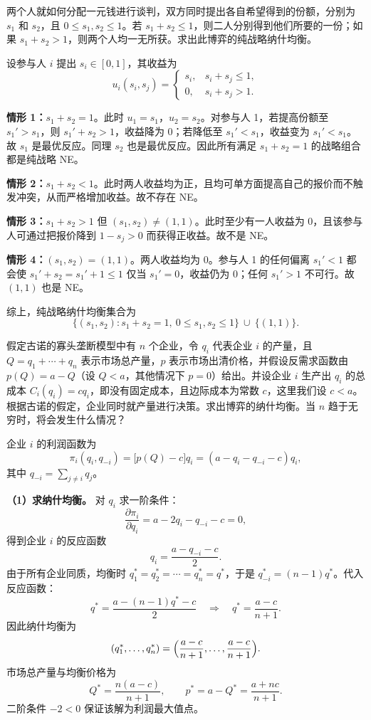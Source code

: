 两个人就如何分配一元钱进行谈判，双方同时提出各自希望得到的份额，分别为 $s_1$ 和 $s_2$，且 $0\le s_1,s_2\le1$。若 $s_1+s_2\le1$，则二人分别得到他们所要的一份；如果 $s_1+s_2>1$，则两个人均一无所获。求出此博弈的纯战略纳什均衡。

\sol
设参与人 $i$ 提出 $s_i\in[0,1]$，其收益为
\[
  u_i(s_i,s_j)=\begin{cases}
    s_i, & s_i+s_j\le1,\\
    0, & s_i+s_j>1.
  \end{cases}
\]

\textbf{情形 1：}$s_1+s_2=1$。此时 $u_1=s_1$，$u_2=s_2$。对参与人 1，若提高份额至 $s_1'>s_1$，则 $s_1'+s_2>1$，收益降为 0；若降低至 $s_1'<s_1$，收益变为 $s_1'<s_1$。故 $s_1$ 是最优反应。同理 $s_2$ 也是最优反应。因此所有满足 $s_1+s_2=1$ 的战略组合都是纯战略 NE。

\textbf{情形 2：}$s_1+s_2<1$。此时两人收益均为正，且均可单方面提高自己的报价而不触发冲突，从而严格增加收益。故不存在 NE。

\textbf{情形 3：}$s_1+s_2>1$ 但 $(s_1,s_2)\ne(1,1)$。此时至少有一人收益为 0，且该参与人可通过把报价降到 $1-s_j>0$ 而获得正收益。故不是 NE。

\textbf{情形 4：}$(s_1,s_2)=(1,1)$。两人收益均为 0。参与人 1 的任何偏离 $s_1'<1$ 都会使 $s_1'+s_2=s_1'+1\le1$ 仅当 $s_1'=0$，收益仍为 0；任何 $s_1'>1$ 不可行。故 $(1,1)$ 也是 NE。

综上，纯战略纳什均衡集合为
\[
  \boxed{\{(s_1,s_2):s_1+s_2=1,\ 0\le s_1,s_2\le1\}\ \cup\ \{(1,1)\}}.
\]

假定古诺的寡头垄断模型中有 $n$ 个企业，令 $q_i$ 代表企业 $i$ 的产量，且 $Q=q_1+\cdots+q_n$ 表示市场总产量，$p$ 表示市场出清价格，并假设反需求函数由 $p(Q)=a-Q$（设 $Q<a$，其他情况下 $p=0$）给出。并设企业 $i$ 生产出 $q_i$ 的总成本 $C_i(q_i)=cq_i$，即没有固定成本，且边际成本为常数 $c$，这里我们设 $c<a$。根据古诺的假定，企业同时就产量进行决策。求出博弈的纳什均衡。当 $n$ 趋于无穷时，将会发生什么情况？

\sol
企业 $i$ 的利润函数为
\[
  \pi_i(q_i,q_{-i})=\bigl[p(Q)-c\bigr]q_i=(a-q_i-q_{-i}-c)q_i,
\]\indent
其中 $q_{-i}=\sum_{j\ne i}q_j$。

\textbf{（1）求纳什均衡。} 对 $q_i$ 求一阶条件：
\[
  \frac{\partial\pi_i}{\partial q_i}=a-2q_i-q_{-i}-c=0,
\]\indent
得到企业 $i$ 的反应函数
\[
  q_i=\frac{a-q_{-i}-c}{2}.
\]\indent
由于所有企业同质，均衡时 $q_1^*=q_2^*=\cdots=q_n^*=q^*$，于是 $q_{-i}^*=(n-1)q^*$。代入反应函数：
\[
  q^*=\frac{a-(n-1)q^*-c}{2}
  \quad\Longrightarrow\quad
  q^*=\frac{a-c}{n+1}.
\]\indent
因此纳什均衡为
\[
  \boxed{(q_1^*,\dots,q_n^*)=\Bigl(\frac{a-c}{n+1},\dots,\frac{a-c}{n+1}\Bigr)}.
\]\indent
市场总产量与均衡价格为
\[
  Q^*=\frac{n(a-c)}{n+1},\qquad p^*=a-Q^*=\frac{a+nc}{n+1}.
\]\indent
二阶条件 $-2<0$ 保证该解为利润最大值点。


